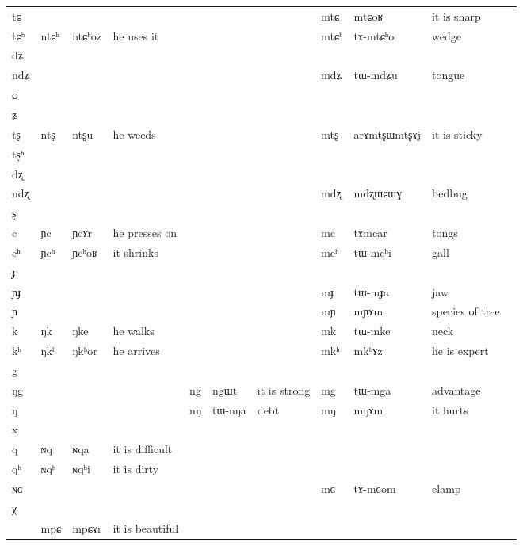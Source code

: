 \documentclass[oldfontcommands,oneside,a4paper,11pt]{article}
\newcommand{\ipa}[1]{{\phon #1}} %
\begin{document}
\begin{table}
{\begin{tabular}{l|lll|lll|lll|l}
\ipa{tɕ}	&	&	&	&	&	&	&	\ipa{mtɕ}	&	\ipa{mtɕoʁ}	&	it is sharp	\\
\ipa{tɕʰ}	&	\ipa{ntɕʰ}	&	\ipa{ntɕʰoz}	&he uses it	&	&	&	&	\ipa{mtɕʰ}	&	\ipa{tɤ-mtɕʰo}	&	wedge	\\
\ipa{dʑ}	&	&	&	&	&	&	&	&	&		\\
\ipa{ndʑ}	&	&	&	&	&	&	&	\ipa{mdʑ}	&	\ipa{tɯ-mdʑu}	&	tongue	\\
\ipa{ɕ}	&	&	&	&	&	&	&	&	&		\\
\ipa{ʑ}	&	&	&	&	&	&	&	&	&		\\
\ipa{tʂ}	&	\ipa{ntʂ}	&	\ipa{ntʂu}	&	he weeds&	&	&	&	\ipa{mtʂ}	&	\ipa{arɤmtʂɯmtʂɤj}	&	it is sticky	\\
\ipa{tʂʰ}	&	&	&	&	&	&	&	&	&		\\
\ipa{dʐ}	&	&	&	&	&	&	&	&	&		\\
\ipa{ndʐ}	&	&	&	&	&	&	&	\ipa{mdʐ}	&	\ipa{mdʐɯɕɯɣ}	&	bedbug	\\
\ipa{ʂ}	&	&	&	&	&	&	&	&	&		\\
\ipa{c}	&	\ipa{ɲc}	&	\ipa{ɲcɤr}	&	he presses on&	&	&	&	\ipa{mc}	&	\ipa{tɤmcar}	&	tongs	\\
\ipa{cʰ}	&	\ipa{ɲcʰ}	&	\ipa{ɲcʰoʁ}	&	it shrinks&	&	&	&	\ipa{mcʰ}	&	\ipa{tɯ-mcʰi}	&	gall	\\
\ipa{ɟ}	&	&	&	&	&	&	&	&	&		\\
\ipa{ɲɟ}	&	&	&	&	&	&	&	\ipa{mɟ}	&	\ipa{tɯ-mɟa}	&	jaw	\\
\ipa{ɲ}	&	&	&	&	&	&	&	\ipa{mɲ}	&	\ipa{mɲɤm}	&	species of tree	\\
\ipa{k}	&	\ipa{ŋk}	&	\ipa{ŋke}	&	he walks&	&	&	&	\ipa{mk}	&	\ipa{tɯ-mke}	&	neck	\\
\ipa{kʰ}	&	\ipa{ŋkʰ}	&	\ipa{ŋkʰor}	&he arrives	&	&	&	&	\ipa{mkʰ}	&	\ipa{mkʰɤz}	&he is expert		\\
\ipa{g}	&	&	&	&	&	&	&	&	&		\\
\ipa{ŋg}	&	&	&	&	\ipa{ng}	&	\ipa{ngɯt}	&it is strong	&	\ipa{mg}	&	\ipa{tɯ-mga}	&	advantage	\\
\ipa{ŋ}	&	&	&	&	\ipa{nŋ}	&	\ipa{tɯ-nŋa}	&	debt&	\ipa{mŋ}	&	\ipa{mŋɤm}	&	it hurts	\\
\ipa{x}	&	&	&	&	&	&	&	&	&		\\
\ipa{q}	&	 	\ipa{ɴq}	&	\ipa{ɴqa}	&	it is difficult&	&		&&&&\\
\ipa{qʰ}	 	&	 	\ipa{ɴqʰ}	&	\ipa{ɴqʰi}	&	it is dirty&	&&	&	&	&\\
\ipa{ɴɢ}	 &	&&&	&	&	&	\ipa{mɢ}	&	\ipa{tɤ-mɢom}	&clamp		\\
\ipa{χ}\\
\midrule
&\ipa{mpɕ} &\ipa{mpɕɤr} & it is beautiful\\
\end{tabular}}
\end{table}
\end{document}
